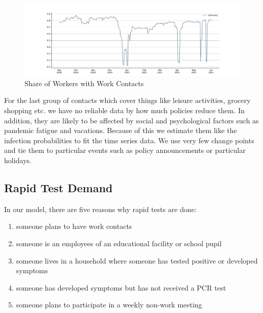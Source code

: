 \begin{figure}[ht]
    \centering
    \includegraphics[width=\textwidth]{../figures/results/figures/data/work_multiplier_since_sep}
    \caption{Share of Workers with Work Contacts}
    \label{fig:work_multiplier}
\end{figure}


For the last group of contacts which cover things like leisure activities, grocery
shopping etc. we have no reliable data by how much policies reduce them.
In addition, they are likely to be affected by social and psychological factors such as
pandemic fatigue and vacations. Because of this we estimate them like the infection
probabilities to fit the time series data. We use very few change points and tie them to
particular events such as policy announcements or particular holidays.

\FloatBarrier

\subsection{Rapid Test Demand}

In our model, there are five reasons why rapid tests are done:
\begin{enumerate}
    \item someone plans to have work contacts
    \item someone is an employees of an educational facility or school pupil
    \item someone lives in a household where someone has tested positive or developed symptoms
    \item someone has developed symptoms but has not received a PCR test
    \item someone plans to participate in a weekly non-work meeting
\end{enumerate}

